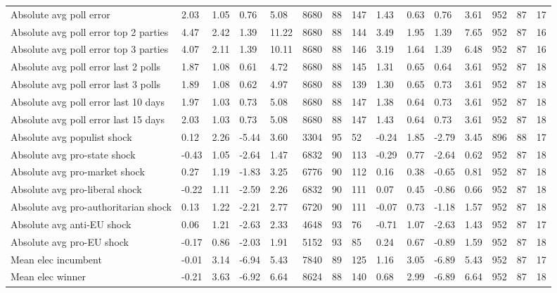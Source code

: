 \begin{longtable}{lllllllllllllll}
Absolute avg poll error & 2.03 & 1.05 & 0.76 & 5.08 & 8680 & 88 & 147 & 1.43 & 0.63 & 0.76 & 3.61 & 952 & 87 & 17\\
Absolute avg poll error top 2 parties & 4.47 & 2.42 & 1.39 & 11.22 & 8680 & 88 & 144 & 3.49 & 1.95 & 1.39 & 7.65 & 952 & 87 & 16\\
Absolute avg poll error top 3 parties & 4.07 & 2.11 & 1.39 & 10.11 & 8680 & 88 & 146 & 3.19 & 1.64 & 1.39 & 6.48 & 952 & 87 & 16\\
\addlinespace
Absolute avg poll error last 2 polls & 1.87 & 1.08 & 0.61 & 4.72 & 8680 & 88 & 145 & 1.31 & 0.65 & 0.64 & 3.61 & 952 & 87 & 18\\
Absolute avg poll error last 3 polls & 1.89 & 1.08 & 0.62 & 4.97 & 8680 & 88 & 139 & 1.30 & 0.65 & 0.73 & 3.61 & 952 & 87 & 18\\
Absolute avg poll error last 10 days & 1.97 & 1.03 & 0.73 & 5.08 & 8680 & 88 & 147 & 1.38 & 0.64 & 0.73 & 3.61 & 952 & 87 & 18\\
Absolute avg poll error last 15 days & 2.03 & 1.03 & 0.73 & 5.08 & 8680 & 88 & 147 & 1.43 & 0.64 & 0.73 & 3.61 & 952 & 87 & 18\\
Absolute avg populist shock & 0.12 & 2.26 & -5.44 & 3.60 & 3304 & 95 & 52 & -0.24 & 1.85 & -2.79 & 3.45 & 896 & 88 & 17\\
\addlinespace
Absolute avg pro-state shock & -0.43 & 1.05 & -2.64 & 1.47 & 6832 & 90 & 113 & -0.29 & 0.77 & -2.64 & 0.62 & 952 & 87 & 18\\
Absolute avg pro-market shock & 0.27 & 1.19 & -1.83 & 3.25 & 6776 & 90 & 112 & 0.16 & 0.38 & -0.65 & 0.81 & 952 & 87 & 18\\
Absolute avg pro-liberal shock & -0.22 & 1.11 & -2.59 & 2.26 & 6832 & 90 & 111 & 0.07 & 0.45 & -0.86 & 0.66 & 952 & 87 & 18\\
Absolute avg pro-authoritarian shock & 0.13 & 1.22 & -2.21 & 2.77 & 6720 & 90 & 111 & -0.07 & 0.73 & -1.18 & 1.57 & 952 & 87 & 18\\
Absolute avg anti-EU shock & 0.06 & 1.21 & -2.63 & 2.33 & 4648 & 93 & 76 & -0.71 & 1.07 & -2.63 & 1.43 & 952 & 87 & 17\\
\addlinespace
Absolute avg pro-EU shock & -0.17 & 0.86 & -2.03 & 1.91 & 5152 & 93 & 85 & 0.24 & 0.67 & -0.89 & 1.59 & 952 & 87 & 18\\
Mean elec incumbent & -0.01 & 3.14 & -6.94 & 5.43 & 7840 & 89 & 125 & 1.16 & 3.05 & -6.89 & 5.43 & 952 & 87 & 17\\
Mean elec winner & -0.21 & 3.63 & -6.92 & 6.64 & 8624 & 88 & 140 & 0.68 & 2.99 & -6.89 & 6.64 & 952 & 87 & 18\\

\end{longtable}
